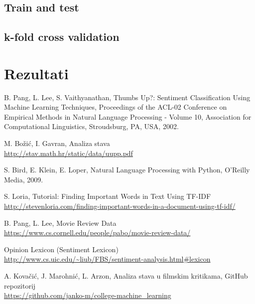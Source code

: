\documentclass[conference]{IEEEtran}
\begin{document}
\subsection{Train and test}

\subsection{k-fold cross validation}

\section{Rezultati}

\begin{thebibliography}{1}

	B. Pang, L. Lee, S. Vaithyanathan,
 	Thumbs Up?: Sentiment Classification Using Machine Learning Techniques,
 	Proceedings of the ACL-02 Conference on Empirical Methods in Natural Language Processing - Volume 10,
 	Association for Computational Linguistics,
	Stroudsburg, PA, USA,
	2002.
	
	M. Božić, I. Gavran,
	Analiza stava\\
	\url{http://stav.math.hr/static/data/uupp.pdf}
	
	S. Bird, E. Klein, E. Loper,
	Natural Language Processing with Python,
	O'Reilly Media,
	2009.
	
	S. Loria,
	Tutorial: Finding Important Words in Text Using TF-IDF\\
	\url{http://stevenloria.com/finding-important-words-in-a-document-using-tf-idf/}

	B. Pang, L. Lee,
	Movie Review Data\\
	\url{https://www.cs.cornell.edu/people/pabo/movie-review-data/}
	
	Opinion Lexicon (Sentiment Lexicon)\\
	\url{http://www.cs.uic.edu/~liub/FBS/sentiment-analysis.html#lexicon}
	
	A. Kovačić, J. Marohnić, L. Arzon,
	Analiza stava u filmskim kritikama,
	GitHub repozitorij\\
	\url{https://github.com/janko-m/college-machine_learning}

\end{thebibliography}
\end{document}
